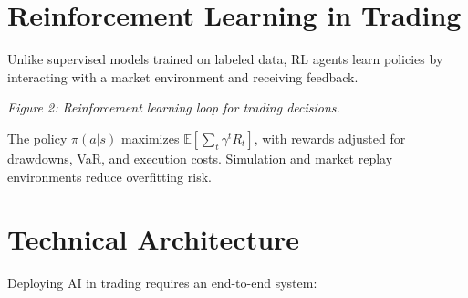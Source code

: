 \documentclass[12pt]{article}
\begin{document}
\section*{Reinforcement Learning in Trading}
Unlike supervised models trained on labeled data, RL agents learn policies by interacting with a market environment and receiving feedback.

\begin{center}

\vspace{0.5cm}
\textit{Figure 2: Reinforcement learning loop for trading decisions.}
\end{center}

The policy $\pi(a|s)$ maximizes $\mathbb{E}[\sum_{t}\gamma^t R_t]$, with rewards adjusted for drawdowns, VaR, and execution costs. Simulation and market replay environments reduce overfitting risk.


\newpage
\section*{Technical Architecture}
Deploying AI in trading requires an end-to-end system:
\end{document}
